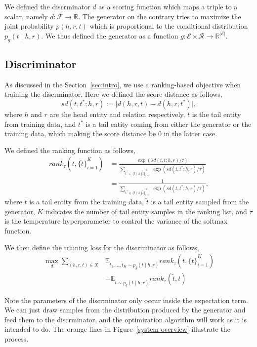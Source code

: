 \documentclass[twocolumn,a4paper,10pt,review,5p]{elsarticle}
\begin{document}
We defined the discrminator $d$ as a scoring function which maps a triple to a scalar, namely $d: \mathcal{F}\rightarrow \mathbb{R}$. The generator on the contrary tries to maximize the joint probability $p(h, r, t)$ which is proportional to the conditional distribution $p_g(t \mid h, r)$. We thus defined the generator as a function $g: \mathcal{E} \times \mathcal{R} \rightarrow \mathbb{R}^{\lvert \mathcal{E} \rvert}$.

\subsection{Discriminator}

As discussed in the Section~\ref{sec:intro}, we use a ranking-based objective when training the discrminator. Here we defined the score distance as follows,
\[
    sd(t, t^*; h, r) := \lvert d(h, r, t) - d(h, r, t^*) \rvert,
\]
where $h$ and $r$ are the head entity and relation respectively, $t$ is the tail entity from training data, and $t^*$ is a tail entity coming from either the generator or the training data, which making the score distance be 0 in the latter case.

We defined the ranking function as follows,
\begin{align*}
    rank_\tau(t, {\{\tilde t \}}_{i=1}^K)
    &= \frac{\exp(sd(t, t; h, r) / \tau)}
        {\sum_{t^*\in \{t\} \cup {\{\tilde t \}}_{i=1}^K } \exp (sd(t, t^*; h, r) / \tau) } \\
    &= \frac{1}
        {\sum_{t^*\in \{t\} \cup {\{\tilde t \}}_{i=1}^K } \exp (sd(t, t^*; h, r) / \tau) },
\end{align*}
where $t$ is a tail entity from the training data, $\tilde t$ is a tail entity sampled from the generator, $K$ indicates the number of tail entity samples in the ranking list, and $\tau$ is the temperature hyperparameter to control the variance of the softmax function.

We then define the training loss for the discriminator as follows,
\begin{align*}
    \max_d \sum_{(h, r, t)\in X}
        &\mathbb{E}_{\tilde t_1, \dots, \tilde t_K \sim p_g(t \mid h, r)}
            rank_\tau(t, {\{\tilde t \}}_{i=1}^K) \\
        &- \mathbb{E}_{\tilde t \sim p_g(t \mid h, r)}
            rank_\tau(\tilde t, t)
\end{align*}

Note the parameters of the discrminator only occur inside the expectation term. We can just draw samples from the distribution produced by the generator and feed them to the discrminator, and the optimization algorithm will work as it is intended to do. The orange lines in Figure~\ref{system-overview} illustrate the process.
\end{document}

